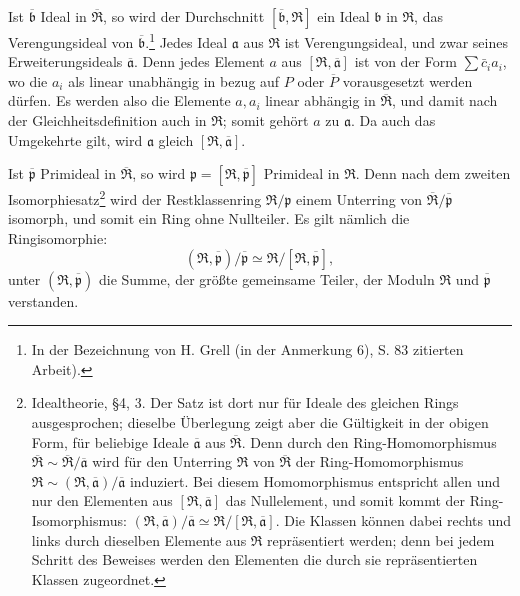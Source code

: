 \documentclass[11pt]{article}
\begin{document}
Ist $\overline{\mathfrak b}$ Ideal in $\overline{\mathfrak R}$, so wird der Durchschnitt $[\overline{\mathfrak b},\mathfrak R]$ ein Ideal $\mathfrak b$ in $\mathfrak R$, das Verengungsideal von $\overline{\mathfrak b}$.\footnote{In der Bezeichnung von H. Grell (in der Anmerkung 6), S. 83 zitierten Arbeit).} Jedes Ideal $\mathfrak a$ aus $\mathfrak R$ ist Verengungsideal, und zwar seines Erweiterungsideals $\overline{\mathfrak a}$. Denn jedes Element $a$ aus $[\mathfrak R,\overline{\mathfrak a}]$ ist von der Form $\sum \bar c_i a_i$, wo die $a_i$ als linear unabhängig in bezug auf $P$ oder $\overline P$ vorausgesetzt werden dürfen. Es werden also die Elemente $a,a_i$ linear abhängig in $\overline{\mathfrak R}$, und damit nach der Gleichheitsdefinition auch in $\mathfrak R$; somit gehört $a$ zu $\mathfrak a$. Da auch das Umgekehrte gilt, wird $\mathfrak a$ gleich $[\mathfrak R,\overline{\mathfrak a}]$.

Ist $\overline{\mathfrak p}$ Primideal in $\overline{\mathfrak R}$, so wird $\mathfrak p=[\mathfrak R,\overline{\mathfrak p}]$ Primideal in $\mathfrak R$. Denn nach dem zweiten Isomorphiesatz\footnote{Idealtheorie, \S 4, 3. Der Satz ist dort nur für Ideale des gleichen Rings ausgesprochen; dieselbe Überlegung zeigt aber die Gültigkeit in der obigen Form, für beliebige Ideale $\overline{\mathfrak a}$ aus $\overline{\mathfrak R}$. Denn durch den Ring-Homomorphismus $\overline{\mathfrak R}\sim\overline{\mathfrak R}/\overline{\mathfrak a}$ wird für den Unterring $\mathfrak R$ von $\overline{\mathfrak R}$ der Ring-Homomorphismus $\mathfrak R\sim(\mathfrak R,\overline{\mathfrak a})/\overline{\mathfrak a}$ induziert. Bei diesem Homomorphismus entspricht allen und nur den Elementen aus $[\mathfrak R,\overline{\mathfrak a}]$ das Nullelement, und somit kommt der Ring-Isomorphismus: $(\mathfrak R,\overline{\mathfrak a})/\overline{\mathfrak a}\simeq \mathfrak R/[\mathfrak R,\overline{\mathfrak a}]$. Die Klassen können dabei rechts und links durch dieselben Elemente aus $\mathfrak R$ repräsentiert werden; denn bei jedem Schritt des Beweises werden den Elementen die durch sie repräsentierten Klassen zugeordnet.} wird der Restklassenring $\mathfrak R/\mathfrak p$ einem Unterring von $\overline{\mathfrak R}/\overline{\mathfrak p}$ isomorph, und somit ein Ring ohne Nullteiler. Es gilt nämlich die Ringisomorphie:
\[
   (\mathfrak R,\overline{\mathfrak p})/\overline{\mathfrak p}
     \simeq \mathfrak R/[\mathfrak R,\overline{\mathfrak p}],
\]
unter $(\mathfrak R,\overline{\mathfrak p})$ die Summe, der größte gemeinsame Teiler, der Moduln $\mathfrak R$ und $\overline{\mathfrak p}$ verstanden.
\end{document}
